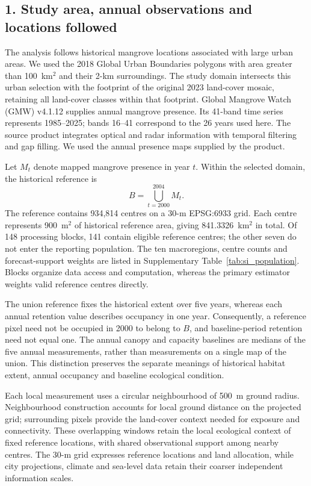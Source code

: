 \subsection{1. Study area, annual observations and locations followed}

The analysis follows historical mangrove locations associated with large urban areas. We used the 2018 Global Urban Boundaries polygons with area greater than 100~km$^2$ and their 2-km surroundings\cite{ref086}. The study domain intersects this urban selection with the footprint of the original 2023 land-cover mosaic, retaining all land-cover classes within that footprint. Global Mangrove Watch (GMW) v4.1.12 supplies annual mangrove presence\cite{GMW2026}. Its 41-band time series represents 1985--2025; bands 16--41 correspond to the 26 years used here. The source product integrates optical and radar information with temporal filtering and gap filling. We used the annual presence maps supplied by the product.

Let $M_t$ denote mapped mangrove presence in year $t$. Within the selected domain, the historical reference is
\begin{equation}\label{eq:si_reference}
B=\bigcup_{t=2000}^{2004}M_t.
\end{equation}
The reference contains 934,814 centres on a 30-m EPSG:6933 grid. Each centre represents 900~m$^2$ of historical reference area, giving 841.3326~km$^2$ in total. Of 148 processing blocks, 141 contain eligible reference centres; the other seven do not enter the reporting population. The ten macroregions, centre counts and forecast-support weights are listed in Supplementary Table~\ref{tab:si_population}. Blocks organize data access and computation, whereas the primary estimator weights valid reference centres directly.

The union reference fixes the historical extent over five years, whereas each annual retention value describes occupancy in one year. Consequently, a reference pixel need not be occupied in 2000 to belong to $B$, and baseline-period retention need not equal one. The annual canopy and capacity baselines are medians of the five annual measurements, rather than measurements on a single map of the union. This distinction preserves the separate meanings of historical habitat extent, annual occupancy and baseline ecological condition.

Each local measurement uses a circular neighbourhood of 500~m ground radius. Neighbourhood construction accounts for local ground distance on the projected grid; surrounding pixels provide the land-cover context needed for exposure and connectivity. These overlapping windows retain the local ecological context of fixed reference locations, with shared observational support among nearby centres. The 30-m grid expresses reference locations and land allocation, while city projections, climate and sea-level data retain their coarser independent information scales.

